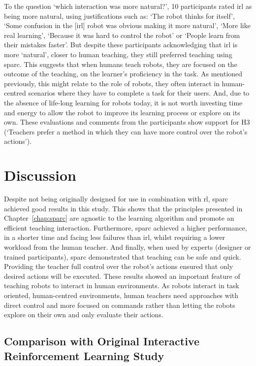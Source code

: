 To the question `which interaction was more natural?', 10 participants rated \gls{irl} as being more natural, using justifications such as: `The robot thinks for itself', `Some confusion in the [\gls{irl}] robot was obvious making it more natural', `More like real learning', `Because it was hard to control the robot' or `People learn from their mistakes faster'. But despite these participants acknowledging that \gls{irl} is more `natural', closer to human teaching, they still preferred teaching using \gls{sparc}. This suggests that when humans teach robots, they are focused on the outcome of the teaching, on the learner's proficiency in the task. As mentioned previously, this might relate to the role of robots, they often interact in human-centred scenarios where they have to complete a task for their users. And, due to the absence of life-long learning for robots today, it is not worth investing time and energy to allow the robot to improve its learning process or explore on its own. These evaluations and comments from the participants show support for H3 (`Teachers prefer a method in which they can have more control over the robot's actions').

\section{Discussion}
\label{sec:control_discussion}

Despite not being originally designed for use in combination with \acrlong{rl}, \gls{sparc} achieved good results in this study. This shows that the principles presented in Chapter~\ref{chap:sparc} are agnostic to the learning algorithm and promote an efficient teaching interaction. Furthermore, \gls{sparc} achieved a higher performance, in a shorter time and facing less failures than \gls{irl}, whilst requiring a lower workload from the human teacher. And finally, when used by experts (designer or trained participants), \gls{sparc} demonstrated that teaching can be safe and quick. Providing the teacher full control over the robot's actions ensured that only desired actions will be executed. These results showed an important feature of teaching robots to interact in human environments. As robots interact in task oriented, human-centred environments, human teachers need approaches with direct control and more focused on commands rather than letting the robots explore on their own and only evaluate their actions.

\subsection{Comparison with Original Interactive Reinforcement Learning Study}

